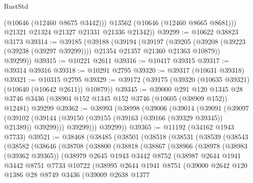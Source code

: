\begin{lexlean}{RustStd}
\begin{coremodule}
            (@10646 (@12460 @8675 @3442)))
          @13562
          (@10646 (@12460 @8665 @8681)))
        @21321
        @21324
        @21327
        @21331
        @21336
        @21342))
@39299 := @10622 @38823 @3173
@39314 := @39185
    (@39188
      (@39194
        (@39197
          (@39205 (@39208 (@39223 (@39238 (@39297 @39299)))) @21354 @21357 @21360 @21363 @10879))
        @39299))
@39315 := @10221 @2611
@39316 := @10417 @39315
@39317 := @39314 @39316
@39318 := @10291 @2795
@39320 := @39317 (@10631 @39318)
@39321 := @10315 @2795
@39329 := @39172 (@39175 (@39320 (@10635 @39321) (@10640 (@10642 @2611)) @10879))
@39345 := @39000
    @291
    @120
    @1345
    @28
    @3746
    @3436
    (@38904 @152 @1345 @152 @3746 (@10605 (@38909 @152)) @12481)
    @39299
@39362 := @38993
    (@38998
      (@39006
        (@39014
          (@39091
            (@39097
              (@39102 (@39144 (@39150 (@39155 (@39163 (@39166 (@39329 @39345)) @21389)) @39299)))
              @39299)))
        @39299))
@39365 := @11192 (@34162 @1943 @7733)
@39521 := @38468
    (@38485
      (@38501
        (@38518
          (@38531
            (@38539
              (@38543
                (@38582
                  (@38646
                    (@38708
                      (@38800
                        (@38818
                          (@38867
                            (@38966
                              (@38978
                                (@38983 (@39362 @39365))
                                (@38979
                                  @2645
                                  @1943
                                  @3442
                                  @8752
                                  (@38987
                                    @2644
                                    @1941
                                    @3442
                                    @8751
                                    @7733
                                    @10722
                                    (@38995
                                      @2644
                                      @1941
                                      @8751
                                      (@39000
                                        @2642
                                        @120
                                        @1386
                                        @28
                                        @8749
                                        @3436
                                        (@39009
                                          @2638
                                          @1377

\end{coremodule}
\end{lexlean}
